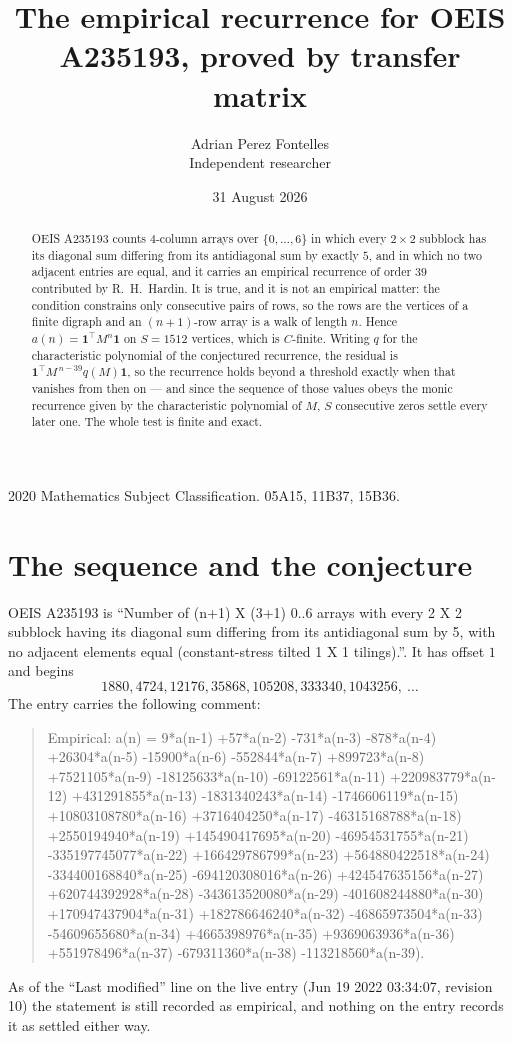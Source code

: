 \documentclass[11pt,a4paper]{article}
\title{The empirical recurrence for OEIS A235193, proved by transfer matrix}
\author{Adrian Perez Fontelles\\ \small Independent researcher}
\date{31 August 2026}
\theoremstyle{plain}
\theoremstyle{definition}
\begin{document}
\maketitle

\begin{abstract}
OEIS A235193 counts $4$-column arrays over $\{0,\dots,6\}$ in which every
$2\times2$ subblock has its diagonal sum differing from its antidiagonal sum by
exactly $5$, and in which no two adjacent entries are equal, and it
carries an empirical recurrence of order $39$ contributed by R.~H.~Hardin. It is true,
and it is not an empirical matter: the condition constrains only consecutive pairs of rows,
so the rows are the vertices of a finite digraph and an $(n+1)$-row array is a walk of
length $n$. Hence $a(n)=\mathbf{1}^{\!\top}M^{n}\mathbf{1}$ on $S=1512$ vertices, which
is $C$-finite. Writing $q$ for the characteristic polynomial of the conjectured recurrence,
the residual is $\mathbf{1}^{\!\top}M^{\,n-39}q(M)\mathbf{1}$, so the recurrence
holds beyond a threshold exactly when that vanishes from then on --- and since the sequence
of those values obeys the monic recurrence given by the characteristic polynomial of $M$,
$S$ consecutive zeros settle every later one. The whole test is finite and exact.
\end{abstract}

\noindent\small 2020 Mathematics Subject Classification. 05A15, 11B37, 15B36.\normalsize

\section{The sequence and the conjecture}

OEIS A235193 is ``Number of (n+1) X (3+1) 0..6 arrays with every 2 X 2 subblock having its diagonal sum differing from its antidiagonal sum by 5, with no adjacent elements equal (constant-stress tilted 1 X 1 tilings).''. It has offset
$1$ and begins
\[
1880, 4724, 12176, 35868, 105208, 333340, 1043256,\ \dots
\]
The entry carries the following comment:
\begin{quote}\small
Empirical: a(n) = 9*a(n-1) +57*a(n-2) -731*a(n-3) -878*a(n-4) +26304*a(n-5) -15900*a(n-6) -552844*a(n-7) +899723*a(n-8) +7521105*a(n-9) -18125633*a(n-10) -69122561*a(n-11) +220983779*a(n-12) +431291855*a(n-13) -1831340243*a(n-14) -1746606119*a(n-15) +10803108780*a(n-16) +3716404250*a(n-17) -46315168788*a(n-18) +2550194940*a(n-19) +145490417695*a(n-20) -46954531755*a(n-21) -335197745077*a(n-22) +166429786799*a(n-23) +564880422518*a(n-24) -334400168840*a(n-25) -694120308016*a(n-26) +424547635156*a(n-27) +620744392928*a(n-28) -343613520080*a(n-29) -401608244880*a(n-30) +170947437904*a(n-31) +182786646240*a(n-32) -46865973504*a(n-33) -54609655680*a(n-34) +4665398976*a(n-35) +9369063936*a(n-36) +551978496*a(n-37) -679311360*a(n-38) -113218560*a(n-39).
\end{quote}
As of the ``Last modified'' line on the live entry (Jun 19 2022 03:34:07, revision 10) the statement is
still recorded as empirical, and nothing on the entry records it as settled either way.
\end{document}
